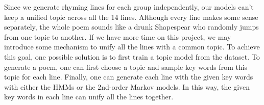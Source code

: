 Since we generate rhyming lines for each group independently, our models can't keep a unified topic across all the 14 lines. Although every line makes some sense separately, the whole poem sounds like a drunk Shapespear who randomly jumps from one topic to another. If we have more time on this project, we may introduce some mechanism to unify all the lines with a common topic. To achieve this goal, one possible solution is to first train a topic model from the dataset. To generate a poem, one can first choose a topic and sample key words from this topic for each line. Finally, one can generate each line with the given key words with either the HMMs or the 2nd-order Markov models. In this way, the given key words in each line can unify all the lines together. 